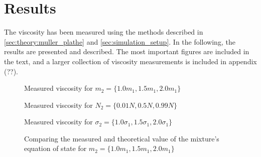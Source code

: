 \chapter{Results}
The viscosity has been measured using the methods
described in \ref{sec:theory:muller_plathe} and 
\ref{sec:simulation_setup}. In the following, 
the results are presented and described. The 
most important figures are included in the text, 
and a larger collection of viscosity measurements 
is included in appendix (??).


\begin{figure}[htbp]
    \begin{center}
        
        \caption{
            Measured viscosity for $m_2 = 
            \{1.0m_1, 1.5m_1, 2.0m_1\}$
        }
    \end{center}
\end{figure}
\begin{figure}[htbp]
    \begin{center}
        
        \caption{
            Measured viscosity for $N_2 = 
            \{0.01N, 0.5N, 0.99N\}$
        }
    \end{center}
\end{figure}
\begin{figure}[htbp]
    \begin{center}
        
        \caption{
            Measured viscosity for $\sigma_2 = 
            \{1.0\sigma_1, 1.5\sigma_1, 2.0\sigma_1\}$
        }
    \end{center}
\end{figure}

\begin{figure}[htbp]
    \begin{center}
        
    \end{center}
        \caption{
            Comparing the measured and theoretical value of the mixture's
            equation of state for $m_2 = \{1.0m_1, 1.5m_1, 2.0m_1\}$
        }
\end{figure}
